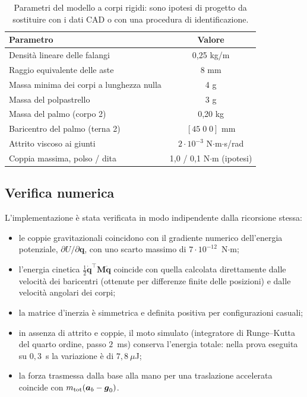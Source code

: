 \begin{table}[htbp]
    \centering
    \renewcommand{\arraystretch}{1.1}
    \begin{tabular}{|l|c|}
        \hline
        Parametro & Valore\\ \hline \hline
        Densità lineare delle falangi & 0,25 kg/m\\
        Raggio equivalente delle aste & 8 mm\\
        Massa minima dei corpi a lunghezza nulla & 4 g\\
        Massa del polpastrello & 3 g\\
        Massa del palmo (corpo 2) & 0,20 kg\\
        Baricentro del palmo (terna 2) & $[45\;0\;0]$ mm\\
        Attrito viscoso ai giunti & $2\cdot10^{-3}$ N$\cdot$m$\cdot$s/rad\\
        Coppia massima, polso / dita & 1,0 / 0,1 N$\cdot$m (ipotesi)\\ \hline
    \end{tabular}
    \caption{Parametri del modello a corpi rigidi: sono ipotesi di progetto da sostituire con i dati CAD o con una procedura di identificazione.}
    \label{tab:inertial}
\end{table}

\subsection{Verifica numerica}

L'implementazione è stata verificata in modo indipendente dalla ricorsione stessa:
\begin{itemize}
    \item le coppie gravitazionali coincidono con il gradiente numerico dell'energia potenziale, $\partial U/\partial\boldsymbol q$, con uno scarto massimo di $7\cdot10^{-12}$~N$\cdot$m;
    \item l'energia cinetica $\frac12\dot{\boldsymbol q}^\top\boldsymbol M\dot{\boldsymbol q}$ coincide con quella calcolata direttamente dalle velocità dei baricentri (ottenute per differenze finite delle posizioni) e dalle velocità angolari dei corpi;
    \item la matrice d'inerzia è simmetrica e definita positiva per configurazioni casuali;
    \item in assenza di attrito e coppie, il moto simulato (integratore di Runge--Kutta del quarto ordine, passo $2$~ms) conserva l'energia totale: nella prova eseguita su $0{,}3$~s la variazione è di $7{,}8~\mu$J;
    \item la forza trasmessa dalla base alla mano per una traslazione accelerata coincide con $m_{\rm tot}(\boldsymbol a_b-\boldsymbol g_0)$.
\end{itemize}

